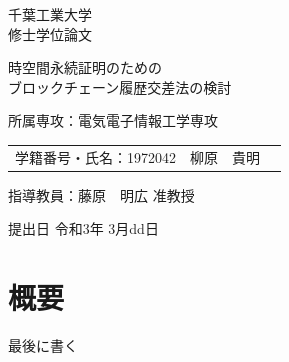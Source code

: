 \documentclass[a4paper,12pt]{jsarticle}
\begin{document}
\begin{titlepage}
\begin{center}
\fontsize{14pt}{0pt}\selectfont
\par
千葉工業大学\\
修士学位論文

\vspace{3cm}

\fontsize{14pt}{3pt}\selectfont
\par
\Huge 時空間永続証明のための\\
\Huge ブロックチェーン履歴交差法の検討\\

\vspace{7cm}

\fontsize{14pt}{1cm}\selectfont
\par
所属専攻：電気電子情報工学専攻
\vspace{0.25cm}

\fontsize{14pt}{0pt}\selectfont
\begin{tabular}{lll}
学籍番号・氏名：1972042 & 柳原　貴明 \\
\end{tabular}

\vspace{1cm}

\par
指導教員：藤原　明広 准教授

\vspace{1cm}

\par
提出日 令和3年 3月dd日
\end{center}
\end{titlepage}

\normalsize
{}


\section*{概要}
最後に書く                 


\newpage
\tableofcontents
\newpage
\end{document}
